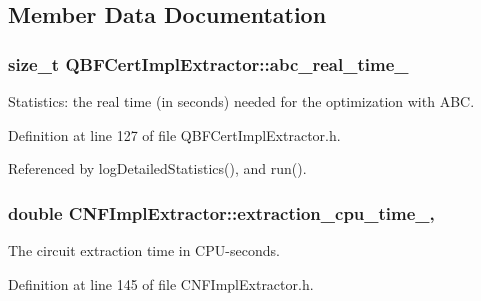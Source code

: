 \subsection{Member Data Documentation}
\hypertarget{classQBFCertImplExtractor_a90be758f6fb963647db3aa9c384075d8}{
\subsubsection[{abc\-\_\-real\-\_\-time\-\_\-}]{\setlength{\rightskip}{0pt plus 5cm}size\-\_\-t Q\-B\-F\-Cert\-Impl\-Extractor\-::abc\-\_\-real\-\_\-time\-\_\-\hspace{0.3cm}{\ttfamily [protected]}}}\label{classQBFCertImplExtractor_a90be758f6fb963647db3aa9c384075d8}


Statistics\-: the real time (in seconds) needed for the optimization with A\-B\-C. 



Definition at line 127 of file Q\-B\-F\-Cert\-Impl\-Extractor.\-h.



Referenced by log\-Detailed\-Statistics(), and run().

\hypertarget{classCNFImplExtractor_ab8be06d42fd3c4b569ec22cfcf2f508e}{
\subsubsection[{extraction\-\_\-cpu\-\_\-time\-\_\-}]{\setlength{\rightskip}{0pt plus 5cm}double C\-N\-F\-Impl\-Extractor\-::extraction\-\_\-cpu\-\_\-time\-\_\-\hspace{0.3cm}{\ttfamily [protected]}, {\ttfamily [inherited]}}}\label{classCNFImplExtractor_ab8be06d42fd3c4b569ec22cfcf2f508e}


The circuit extraction time in C\-P\-U-\/seconds. 



Definition at line 145 of file C\-N\-F\-Impl\-Extractor.\-h.



